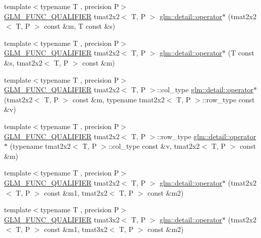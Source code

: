 \begin{DoxyCompactItemize}
\item 
{\footnotesize template$<$typename T , precision P$>$ }\\\hyperlink{setup_8hpp_a33fdea6f91c5f834105f7415e2a64407}{G\+L\+M\+\_\+\+F\+U\+N\+C\+\_\+\+Q\+U\+A\+L\+I\+F\+I\+ER} tmat2x2$<$ T, P $>$ \hyperlink{namespaceglm_1_1detail_a41edd5bf21f4bac92af08038af0d7bdb}{glm\+::detail\+::operator$\ast$} (tmat2x2$<$ T, P $>$ const \&m, T const \&s)
\item 
{\footnotesize template$<$typename T , precision P$>$ }\\\hyperlink{setup_8hpp_a33fdea6f91c5f834105f7415e2a64407}{G\+L\+M\+\_\+\+F\+U\+N\+C\+\_\+\+Q\+U\+A\+L\+I\+F\+I\+ER} tmat2x2$<$ T, P $>$ \hyperlink{namespaceglm_1_1detail_a2d43a66168b2a758379f72916a2e2910}{glm\+::detail\+::operator$\ast$} (T const \&s, tmat2x2$<$ T, P $>$ const \&m)
\item 
{\footnotesize template$<$typename T , precision P$>$ }\\\hyperlink{setup_8hpp_a33fdea6f91c5f834105f7415e2a64407}{G\+L\+M\+\_\+\+F\+U\+N\+C\+\_\+\+Q\+U\+A\+L\+I\+F\+I\+ER} tmat2x2$<$ T, P $>$\+::col\+\_\+type \hyperlink{namespaceglm_1_1detail_acf7be6359d39ea7939b0e96a3fde170a}{glm\+::detail\+::operator$\ast$} (tmat2x2$<$ T, P $>$ const \&m, typename tmat2x2$<$ T, P $>$\+::row\+\_\+type const \&v)
\item 
{\footnotesize template$<$typename T , precision P$>$ }\\\hyperlink{setup_8hpp_a33fdea6f91c5f834105f7415e2a64407}{G\+L\+M\+\_\+\+F\+U\+N\+C\+\_\+\+Q\+U\+A\+L\+I\+F\+I\+ER} tmat2x2$<$ T, P $>$\+::row\+\_\+type \hyperlink{namespaceglm_1_1detail_aaf37a2df233463e90e4df6ebce5f88e9}{glm\+::detail\+::operator$\ast$} (typename tmat2x2$<$ T, P $>$\+::col\+\_\+type const \&v, tmat2x2$<$ T, P $>$ const \&m)
\item 
{\footnotesize template$<$typename T , precision P$>$ }\\\hyperlink{setup_8hpp_a33fdea6f91c5f834105f7415e2a64407}{G\+L\+M\+\_\+\+F\+U\+N\+C\+\_\+\+Q\+U\+A\+L\+I\+F\+I\+ER} tmat2x2$<$ T, P $>$ \hyperlink{namespaceglm_1_1detail_a033370f4b836014777442a835a738af1}{glm\+::detail\+::operator$\ast$} (tmat2x2$<$ T, P $>$ const \&m1, tmat2x2$<$ T, P $>$ const \&m2)
\item 
{\footnotesize template$<$typename T , precision P$>$ }\\\hyperlink{setup_8hpp_a33fdea6f91c5f834105f7415e2a64407}{G\+L\+M\+\_\+\+F\+U\+N\+C\+\_\+\+Q\+U\+A\+L\+I\+F\+I\+ER} tmat3x2$<$ T, P $>$ \hyperlink{namespaceglm_1_1detail_a01f59bf4a35c2fbb1be4cbd91a7d34a8}{glm\+::detail\+::operator$\ast$} (tmat2x2$<$ T, P $>$ const \&m1, tmat3x2$<$ T, P $>$ const \&m2)

\end{DoxyCompactItemize}
